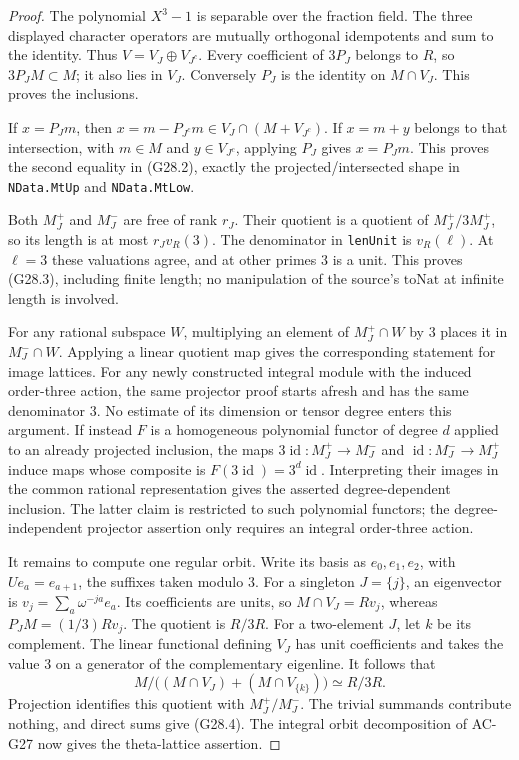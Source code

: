 \begin{proof}
The polynomial $X^3-1$ is separable over the fraction field.
The three displayed character operators are mutually orthogonal
idempotents and sum to the identity.  Thus $V=V_J\oplus V_{J^c}$.
Every coefficient of $3P_J$ belongs to $R$, so $3P_JM\subset M$;
it also lies in $V_J$.  Conversely $P_J$ is the identity on
$M\cap V_J$.  This proves the inclusions.

If $x=P_Jm$, then $x=m-P_{J^c}m\in V_J\cap(M+V_{J^c})$.
If $x=m+y$ belongs to that intersection, with $m\in M$ and
$y\in V_{J^c}$, applying $P_J$ gives $x=P_Jm$.
This proves the second equality in (G28.2), exactly the
projected/intersected shape in \texttt{NData.MtUp} and
\texttt{NData.MtLow}.

Both $M_J^+$ and $M_J^-$ are free of rank $r_J$.
Their quotient is a quotient of $M_J^+/3M_J^+$, so its
length is at most $r_Jv_R(3)$.  The denominator in
\texttt{lenUnit} is $v_R(\ell)$.  At $\ell=3$ these
valuations agree, and at other primes $3$ is a unit.
This proves (G28.3), including finite length; no manipulation
of the source's $\mathrm{toNat}$ at infinite length is involved.

For any rational subspace $W$, multiplying an element of
$M_J^+\cap W$ by $3$ places it in $M_J^-\cap W$.
Applying a linear quotient map gives the corresponding statement
for image lattices.  For any newly constructed integral module
with the induced order-three action, the same projector proof
starts afresh and has the same denominator $3$.  No estimate of
its dimension or tensor degree enters this argument.
If instead $F$ is a homogeneous polynomial functor of degree
$d$ applied to an already projected inclusion, the maps
$3\operatorname{id}:M_J^+\to M_J^-$ and
$\operatorname{id}:M_J^-\to M_J^+$ induce maps whose composite
is $F(3\operatorname{id})=3^d\operatorname{id}$.
Interpreting their images in the common rational representation
gives the asserted degree-dependent inclusion.  The latter
claim is restricted to such polynomial functors; the
degree-independent projector assertion only requires an
integral order-three action.

It remains to compute one regular orbit.  Write its basis as
$e_0,e_1,e_2$, with $Ue_a=e_{a+1}$, the suffixes taken modulo
$3$.  For a singleton $J=\{j\}$, an eigenvector is
$v_j=\sum_a\omega^{-ja}e_a$.  Its coefficients
are units, so $M\cap V_J=Rv_j$, whereas $P_JM=(1/3)Rv_j$.
The quotient is $R/3R$.
For a two-element $J$, let $k$ be its complement.  The
linear functional defining $V_J$ has unit coefficients and
takes the value $3$ on a generator of the complementary
eigenline.  It follows that
\[
 M\big/\big((M\cap V_J)+(M\cap V_{\{k\}})\big)
              \simeq R/3R.
\]
Projection identifies this quotient with $M_J^+/M_J^-$.
The trivial summands contribute nothing, and direct sums give
(G28.4).  The integral orbit decomposition of AC-G27 now gives
the theta-lattice assertion.
\end{proof}

